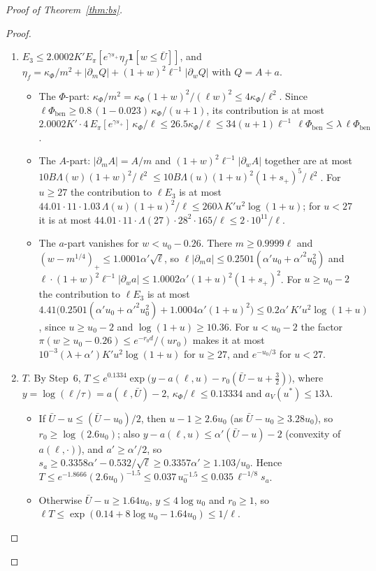 \begin{proof}[Proof of Theorem~\ref{thm:bs}]
\begin{proof}
\begin{enumerate}[label=(\alph*)]
  $\ell\rho_4\le1.0001K'(1+u)(1.6\cdot11.0001\lambda+0.2601\alpha')\le(0.21\lambda+0.004\alpha')K'u^2\log(1+u)$, as
  $(1+u)/(u^2\log(1+u))\le0.0116$. For $u<27$, $a'=0$, $D_a$ vanishes except at $s\ge u_0-27$, and
  $\ell\rho_4\le1.0001\cdot2.2\cdot28\cdot11\Lambda(27)\cdot1049/\ell\le2\cdot10^9/\ell$.
\item $E_3\le2.0002K'E_\pi[e^{\gamma s_+}\eta_f\mathbf 1[w\le\bar U]]$, and $\eta_f=\kappa_\Phi/m^2+|\partial_mQ|+(1+w)^2\ell^{-1}|\partial_wQ|$
  with $Q=A+a$.
  \begin{itemize}
  \item The $\Phi$-part: $\kappa_\Phi/m^2=\kappa_\Phi(1+w)^2/(\ell w)^2\le4\kappa_\Phi/\ell^2$. Since
    $\ell\Phi_{\mathrm{ben}}\ge0.8\,(1-0.023)\,\kappa_\Phi/(u+1)$, its contribution is at most
    $2.0002K'\cdot4\,E_\pi[e^{\gamma s_+}]\,\kappa_\Phi/\ell\le26.5\kappa_\Phi/\ell\le34(u+1)\ell^{-1}\,\ell\Phi_{\mathrm{ben}}\le\lambda\,\ell\Phi_{\mathrm{ben}}$.
  \item The $A$-part: $|\partial_mA|=A/m$ and $(1+w)^2\ell^{-1}|\partial_wA|$ together are at most
    $10B\Lambda(w)(1+w)^2/\ell^2\le10B\Lambda(u)(1+u)^2(1+s_+)^5/\ell^2$. For $u\ge27$ the contribution to $\ell E_3$ is at most
    $44.01\cdot11\cdot1.03\,\Lambda(u)(1+u)^2/\ell\le260\lambda\,K'u^2\log(1+u)$; for $u<27$ it is at most
    $44.01\cdot11\cdot\Lambda(27)\cdot28^2\cdot165/\ell\le2\cdot10^{11}/\ell$.
  \item The $a$-part vanishes for $w<u_0-0.26$. There $m\ge0.9999\ell$ and $(w-m^{1/4})_+\le1.0001\alpha'\sqrt\ell$, so
    $\ell|\partial_ma|\le0.2501(\alpha'u_0+\alpha'^2u_0^2)$ and $\ell\cdot(1+w)^2\ell^{-1}|\partial_wa|\le1.0002\alpha'(1+u)^2(1+s_+)^2$.
    For $u\ge u_0-2$ the contribution to $\ell E_3$ is at most
    $4.41\big(0.2501(\alpha'u_0+\alpha'^2u_0^2)+1.0004\alpha'(1+u)^2\big)\le0.2\alpha'\,K'u^2\log(1+u)$, since
    $u\ge u_0-2$ and $\log(1+u)\ge10.36$. For $u<u_0-2$ the factor $\pi(w\ge u_0-0.26)\le e^{-r_0d}/(ur_0)$ makes it at most
    $10^{-3}(\lambda+\alpha')K'u^2\log(1+u)$ for $u\ge27$, and $e^{-u_0/3}$ for $u<27$.
  \end{itemize}
\item $T$. By Step~6, $T\le e^{0.1334}\exp\big(y-a(\ell,u)-r_0(\bar U-u+\frac32)\big)$, where $y=\log(\ell/\tau)=a(\ell,\bar U)-2$,
  $\kappa_\Phi/\ell\le0.13334$ and $a_V(u^*)\le13\lambda$.
  \begin{itemize}
  \item If $\bar U-u\le(\bar U-u_0)/2$, then $u-1\ge2.6u_0$ (as $\bar U-u_0\ge3.28u_0$), so $r_0\ge\log(2.6u_0)$; also
    $y-a(\ell,u)\le\alpha'(\bar U-u)-2$ (convexity of $a(\ell,\cdot)$), and $a'\ge\alpha'/2$, so
    $s_a\ge0.3358\alpha'-0.532/\sqrt\ell\ge0.3357\alpha'\ge1.103/u_0$. Hence $T\le e^{-1.8666}(2.6u_0)^{-1.5}\le0.037\,u_0^{-1.5}\le0.035\,\ell^{-1/8}s_a$.
  \item Otherwise $\bar U-u\ge1.64u_0$, $y\le4\log u_0$ and $r_0\ge1$, so $\ell T\le\exp(0.14+8\log u_0-1.64u_0)\le1/\ell$.
  \end{itemize}
\end{enumerate}


\end{proof}
\end{proof}
